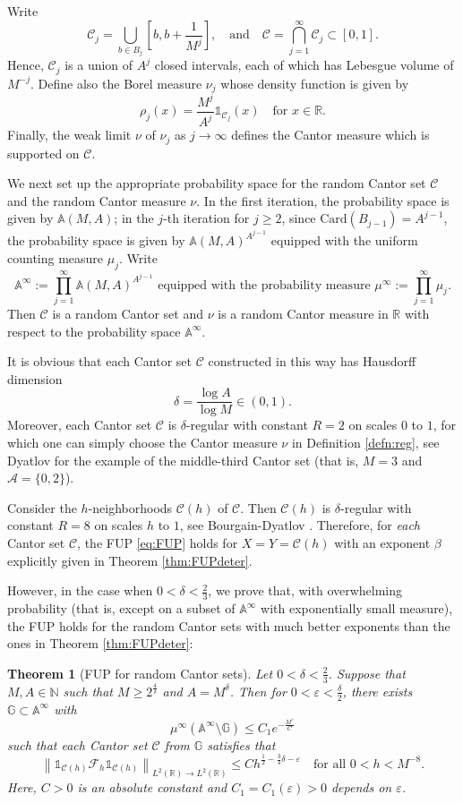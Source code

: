 \documentclass[12pt,reqno]{amsart}
\newcommand\Ab{\mathbb{A}}
\newcommand\Ac{\mathcal{A}}
\newcommand\Card{\mathrm{Card}}
\newcommand\Cc{\mathcal{C}}
\newcommand\Char{\mathds{1}}
\newcommand\Fc{\mathcal{F}}
\newcommand\Gb{\mathbb{G}}
\newcommand\N{\mathbb{N}}
\newcommand\R{\mathbb{R}}
\newcommand\ve{\varepsilon}
\theoremstyle{plain}
\newtheorem{thm}{\textbf{Theorem}}[section]
\theoremstyle{remark}
\numberwithin{equation}{section}
\begin{document}
Write
\begin{equation}\label{eq:Cc}
\Cc_j=\bigcup_{b\in B_j}\left[b,b+\frac{1}{M^j}\right],\quad\text{and}\quad\Cc=\bigcap_{j=1}^\infty\Cc_j\subset[0,1].
\end{equation}
Hence, $\Cc_j$ is a union of $A^j$ closed intervals, each of which has Lebesgue volume of $M^{-j}$. Define also the Borel measure $\nu_j$ whose density function is given by
$$\rho_j(x)=\frac{M^j}{A^j}\Char_{\Cc_j}(x)\quad\text{for }x\in\R.$$
Finally, the weak limit $\nu$ of $\nu_j$ as $j\to\infty$ defines the Cantor measure which is supported on $\Cc$. 

We next set up the appropriate probability space for the random Cantor set $\Cc$ and the random Cantor measure $\nu$. In the first iteration, the probability space is given by $\Ab(M,A)$; in the $j$-th iteration for $j\ge2$, since $\Card(B_{j-1})=A^{j-1}$, the probability space is given by $\Ab(M,A)^{A^{j-1}}$ equipped with the uniform counting measure $\mu_j$. Write
\begin{equation}\label{eq:Ab}
\Ab^\infty:=\prod_{j=1}^\infty\Ab(M,A)^{A^{j-1}}\text{ equipped with the probability measure }\mu^\infty:=\prod_{j=1}^\infty\mu_j.
\end{equation}
Then $\Cc$ is a random Cantor set and $\nu$ is a random Cantor measure in $\R$ with respect to the probability space $\Ab^\infty$. 

It is obvious that each Cantor set $\Cc$ constructed in this way has Hausdorff dimension
$$\delta=\frac{\log A}{\log M}\in(0,1).$$
Moreover, each Cantor set $\Cc$ is $\delta$-regular with constant $R=2$ on scales $0$ to $1$, for which one can simply choose the Cantor measure $\nu$ in Definition \ref{defn:reg}, see Dyatlov \cite[Example 2.6]{Dy} for the example of the middle-third Cantor set (that is, $M=3$ and $\Ac=\{0,2\}$). 

Consider the $h$-neighborhoods $\Cc(h)$ of $\Cc$. Then $\Cc(h)$ is $\delta$-regular with constant $R=8$ on scales $h$ to $1$, see Bourgain-Dyatlov \cite[Lemma 2.3]{BD2}. Therefore, for \textit{each} Cantor set $\Cc$, the FUP \eqref{eq:FUP} holds for $X=Y=\Cc(h)$ with an exponent $\beta$ explicitly given in Theorem \ref{thm:FUPdeter}.

However, in the case when $0<\delta<\frac23$, we prove that, with overwhelming probability (that is, except on a subset of $\Ab^\infty$ with exponentially small measure), the FUP holds for the random Cantor sets with much better exponents than the ones in Theorem \ref{thm:FUPdeter}: 
\begin{thm}[FUP for random Cantor sets]\label{thm:FUPL}
Let $0<\delta<\frac23$. Suppose that $M,A\in\N$ such that $M\ge 2^\frac4\delta$ and $A=M^\delta$. Then for $0<\ve<\frac\delta2$, there exists $\Gb\subset\Ab^\infty$ with
$$\mu^\infty\left(\Ab^\infty\setminus\Gb\right)\le C_1e^{-\frac{M^\ve}{C}}$$
such that each Cantor set $\Cc$ from $\Gb$ satisfies that
$$\left\|\Char_{\Cc(h)}\Fc_h\Char_{\Cc(h)}\right\|_{L^2(\R)\to L^2(\R)}\le Ch^{\frac12-\frac34\delta-\ve}\quad\text{for all }0<h<M^{-8}.$$
Here, $C>0$ is an absolute constant and $C_1=C_1(\ve)>0$ depends on $\ve$.
\end{thm}
\end{document}

